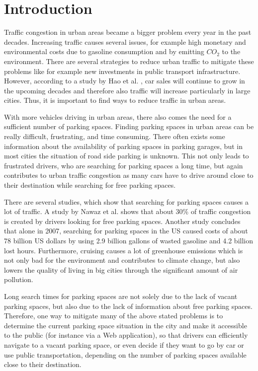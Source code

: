 \chapter{Introduction}
\label{chap:introduction}


Traffic congestion in urban areas became a bigger problem every year in the past decades. Increasing traffic causes several issues, for example high monetary and environmental costs due to gasoline consumption and by emitting $CO_2$ to the environment. There are several strategies to reduce urban traffic to mitigate these problems like for example new investments in public transport infrastructure. However, according to a study by Hao et al. \cite{HAO2016121}, car sales will continue to grow in the upcoming decades and therefore also traffic will increase particularly in large cities. Thus, it is important to find ways to reduce traffic in urban areas.

With more vehicles driving in urban areas, there also comes the need for a sufficient number of parking spaces. Finding parking spaces in urban areas can be really difficult, frustrating, and time consuming. There often exists some information about the availability of parking spaces in parking garages, but in most cities the situation of road side parking is unknown. This not only leads to frustrated drivers, who are searching for parking spaces a long time, but again contributes to urban traffic congestion as many cars have to drive around close to their destination while searching for free parking spaces. 

There are several studies, which show that searching for parking spaces causes a lot of traffic. A study by Nawaz et al. \cite{Nawaz:2013:PSB:2500423.2500438} shows that about 30\% of traffic congestion is created by drivers looking for free parking spaces. Another study \cite{TexasMobilityReport} concludes that alone in 2007, searching for parking spaces in the US caused costs of about 78 billion US dollars by using 2.9 billion gallons of wasted gasoline and 4.2 billion lost hours. Furthermore, cruising causes a lot of greenhouse emissions which is not only bad for the environment and contributes to climate change, but also lowers the quality of living in big cities through the significant amount of air pollution.

Long search times for parking spaces are not solely due to the lack of vacant parking spaces, but also due to the lack of information about free parking spaces. Therefore, one way to mitigate many of the above stated problems is to determine the current parking space situation in the city and make it accessible to the public (for instance via a Web application), so that drivers can efficiently navigate to a vacant parking space, or even decide if they want to go by car or use public transportation, depending on the number of parking spaces available close to their destination. 




